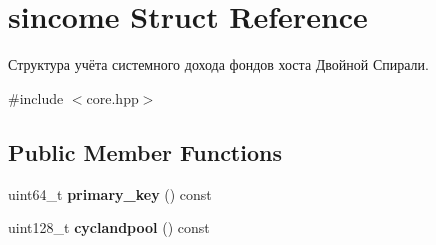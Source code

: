 \hypertarget{structsincome}{}\section{sincome Struct Reference}
\label{structsincome}


Структура учёта системного дохода фондов хоста Двойной Спирали.  




{\ttfamily \#include $<$core.\+hpp$>$}

\subsection*{Public Member Functions}
\begin{DoxyCompactItemize}
\item 
\mbox{\label{structsincome_acfcdc82a654a7934f86c8e9f778a3860}} 
uint64\+\_\+t {\bfseries primary\+\_\+key} () const
\item 
\mbox{\label{structsincome_afafc00e90214c947e7905d360c99a3cf}} 
uint128\+\_\+t {\bfseries cyclandpool} () const
\end{DoxyCompactItemize}
